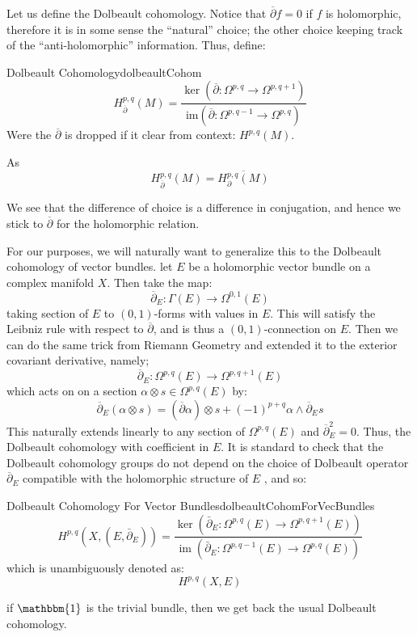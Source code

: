 \documentclass{book}
\newcommand{\im}{{\operatorname{im}}}
\begin{document}
Let us define the Dolbeault cohomology. Notice that $\overline{\partial}f = 0$ if $f$ is holomorphic,
therefore it is in some sense the ``natural'' choice; the other choice keeping track of the
``anti-holomorphic'' information. Thus, define:

\begin{defn}{Dolbeault Cohomology}{dolbeaultCohom}
  \[
H_{\overline{\partial}}^{p,q}(M) = \frac{\ker(\overline{\partial}: \Omega^{p,q} \to \Omega^{p,q+1})}{\text{im}(\overline{\partial}: \Omega^{p,q-1} \to \Omega^{p,q})}
\]
Were the $\overline{\partial}$ is dropped if it clear from context: $H^{p,q}(M)$.
\end{defn}

As
\[
  H_{\overline{\partial}}^{p,q}(M) = \overline{H_{\partial}^{p,q}(M)}
\]

We see that the difference of choice is a difference in conjugation, and hence we stick to
$\overline{\partial}$ for the holomorphic relation.

For our purposes, we will naturally want to generalize this to the Dolbeault cohomology of vector bundles. let
$E$ be a holomorphic vector bundle on a complex manifold $X$. Then take the map:
\[
  \overline{\partial}_E: \Gamma(E) \to \Omega^{0,1}(E)
\]
taking section of $E$ to $(0,1)$-forms with values in $E$. This will satisfy the Leibniz rule  with respect to
$\overline{\partial}$, and is thus a $(0,1)$-connection on $E$. Then we can do the same trick from Riemann
Geometry and extended it to  the exterior covariant derivative, namely;
\[
  \overline{\partial}_E: \Omega^{p,q}(E) \to \Omega^{p, q+1}(E)
\]
which acts on on a section $\alpha \otimes s \in \Omega^{p,q}(E)$ by:
\[
  \overline{\partial}_E(\alpha\otimes s) = (\overline{\partial}\alpha) \otimes s + (-1)^{p+q}\alpha \wedge
  \overline{\partial}_E s
\]
This naturally extends linearly to any section of $\Omega^{p,q}(E)$ and $\overline{\partial}_E^2 = 0$. Thus,
the Dolbeault cohomology with coefficient in $E$.
It is standard to check that the Dolbeault cohomology groups do not depend on the choice of Dolbeault operator
$\overline{\partial}_E$ compatible with the holomorphic structure of $E$
\cite{gallierComplexAlgebraicGeometry2011}, and so:
\begin{defn}{Dolbeault Cohomology For Vector Bundles}{dolbeaultCohomForVecBundles}
  \[
H^{p,q}(X,(E,\bar{\partial}_E)) = \frac{\ker(\bar{\partial}_E : \Omega^{p,q}(E) \to \Omega^{p,q+1}(E))}{\im(\bar{\partial}_E : \Omega^{p,q-1}(E) \to \Omega^{p,q}(E))}
\]
which is unambiguously denoted as:
\[
  H^{p,q}(X,E)
\]
\end{defn}
if $\mathbbm{1}$ is the trivial bundle, then we get back the usual Dolbeault cohomology.
\end{document}
